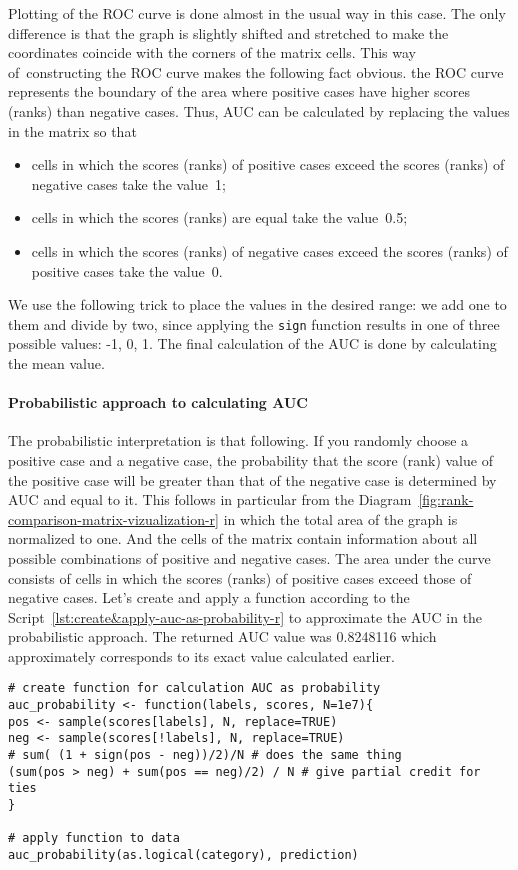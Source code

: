 \documentclass[]{scrreprt}
\begin{document}
Plotting of the ROC curve is done almost in the usual way in this case. The only difference is that the graph is slightly shifted and stretched to make the coordinates coincide with the corners of the matrix cells. This way of~constructing the ROC curve makes the following fact obvious. the ROC curve represents the boundary of the area where positive cases have higher scores (ranks) than negative cases. Thus, AUC can be calculated by replacing the values in the matrix so that
\begin{itemize}
	\item cells in which the scores (ranks) of positive cases exceed the scores (ranks) of negative cases take the value~1;
	\item cells in which the scores (ranks) are equal take the value~0.5;
	\item cells in which the scores (ranks) of negative cases exceed the scores (ranks) of positive cases take the value~0.
\end{itemize}
We use the following trick to place the values in the desired range: we add one to them and divide by two, since applying the \texttt{sign} function results in one of three possible values: -1, 0, 1. The final calculation of the AUC is done by calculating the mean value.

\paragraph{Probabilistic approach to calculating AUC}
The probabilistic interpretation is that following.  If you randomly choose a positive case and a negative case, the probability that the score (rank) value of the positive case will be greater than that of the negative case is determined by AUC and equal to it. This follows in particular from the Diagram~\ref{fig:rank-comparison-matrix-vizualization-r} in which the total area of the graph is normalized to one. And the cells of the matrix contain information about all possible combinations of positive and negative cases. The area under the curve consists of cells in which the scores (ranks) of positive cases exceed those of negative cases. Let's create and apply a function according to the Script~\ref{lst:create&apply-auc-as-probability-r} to approximate the AUC in the probabilistic approach. The returned AUC value was 0.8248116 which approximately corresponds to its exact value calculated earlier.
%
\begin{lstlisting}[float=htp, caption = Creating and applying a~function to calculate AUC as a~probability, firstnumber=1, label= lst:create&apply-auc-as-probability-r]
# create function for calculation AUC as probability
auc_probability <- function(labels, scores, N=1e7){
pos <- sample(scores[labels], N, replace=TRUE)
neg <- sample(scores[!labels], N, replace=TRUE)
# sum( (1 + sign(pos - neg))/2)/N # does the same thing
(sum(pos > neg) + sum(pos == neg)/2) / N # give partial credit for ties
}

# apply function to data
auc_probability(as.logical(category), prediction)
\end{lstlisting}
%
\end{document}
